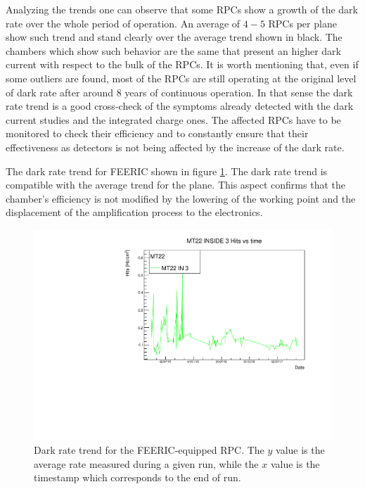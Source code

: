 Analyzing the trends one can observe that some RPCs show a growth of the dark rate over the whole period of operation.
An average of $4-5$ RPCs per plane show such trend and stand clearly over the average trend shown in black.
The chambers which show such behavior are the same that present an higher dark current with respect to the bulk of the RPCs.
It is worth mentioning that, even if some outliers are found, most of the RPCs are still operating at the original level of dark rate after around 8 years of continuous operation.
In that sense the dark rate trend is a good cross-check of the symptoms already detected with the dark current studies and the integrated charge ones.
The affected RPCs have to be monitored to check their efficiency and to constantly ensure that their effectiveness as detectors is not being affected by the increase of the dark rate.

The dark rate trend for FEERIC shown in figure \ref{fig:FEERICDarkRate}.
The dark rate trend is compatible with the average trend for the plane.
This aspect confirms that the chamber's efficiency is not modified by the lowering of the working point and the displacement of the amplification process to the electronics.

\begin{figure}[!t]
\begin{center}
\includegraphics[width=0.95\linewidth]{Chapters/Performance/Figs/DarkRateFEERIC.pdf}
\caption{Dark rate trend for the FEERIC-equipped RPC. The $y$ value is the average rate measured during a given run, while the $x$ value is the timestamp which corresponds to the end of run.}
\label{fig:FEERICDarkRate}
\end{center}
\end{figure}

